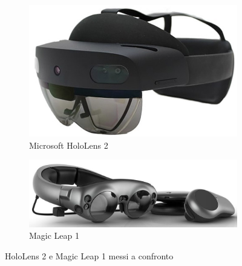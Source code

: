 \begin{figure}[t]
    \centering
    \begin{subfigure}[b]{0.4\textwidth}
        \centering
        \includegraphics[width=\textwidth]{images/Hololens2.jpg}
        \caption{Microsoft HoloLens 2}
        \label{fig:figure17a}
    \end{subfigure}
    \begin{subfigure}[b]{0.55\textwidth}
        \centering
        \includegraphics[width=\textwidth]{images/Magic-Leap1.jpg}
        \caption{Magic Leap 1}
        \label{fig:figure17b}
    \end{subfigure}
       \caption{HoloLens 2 e Magic Leap 1 messi a confronto}
       \label{fig:figure17}
\end{figure}

